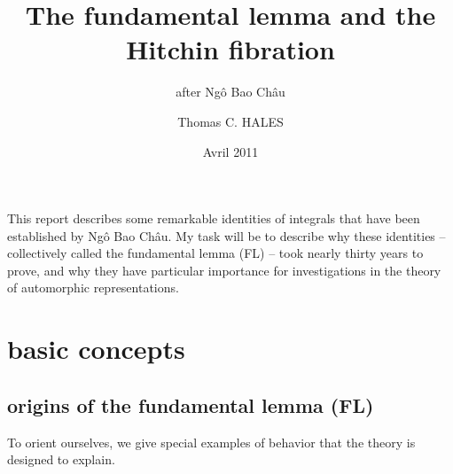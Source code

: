 \documentclass[brochure,english,12pt]{bourbaki}
\date{Avril 2011}
\title{The fundamental lemma and the Hitchin fibration}
\subtitle{after Ng\^o Bao Ch\^au}
\author{Thomas C. HALES}
\begin{document}
\maketitle



{


}

\bigskip



This report describes some remarkable identities of integrals that have
been established by Ng\^o Bao Ch\^au.   My task will be to describe
why these identities -- collectively called the fundamental lemma (FL) --
took nearly thirty years to prove, and why they have particular
importance for investigations in the theory of automorphic
representations.



\section{basic concepts}

\subsection{origins of the fundamental lemma (FL)}\label{sec:origin}


To orient ourselves, we give special examples of
behavior that the theory is designed to explain.
\end{document}
